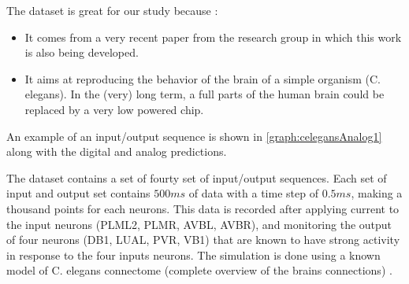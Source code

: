 The dataset is great for our study because :
\begin{itemize}
  \item It comes from a very recent paper from the research group in which this work is also being developed.
  \item It aims at reproducing the behavior of the brain of a simple organism (\ac{C. elegans}). In the (very) long term, a full parts of the human brain could be replaced by a very low powered chip.
\end{itemize}

An example of an input/output sequence is shown in \cref{graph:celegansAnalog1} along with the digital and analog predictions.

The dataset contains a set of fourty set of input/output sequences. Each set of input and output set contains $500ms$ of data with a time step of $0.5ms$, making a thousand points for each neurons. This data is recorded after applying current to the input neurons (PLML2, PLMR, AVBL, AVBR), and monitoring the output of four neurons (DB1, LUAL, PVR, VB1) that are known to have strong activity in response to the four inputs neurons. The simulation is done using a known model of \ac{C. elegans} connectome (complete overview of the brains connections) \cite{celegans}.
